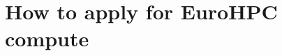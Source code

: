 \documentclass[10pt,aspectratio=169,notheorems]{beamer}
\begin{document}
\section{How to apply for EuroHPC compute}



\end{document}
